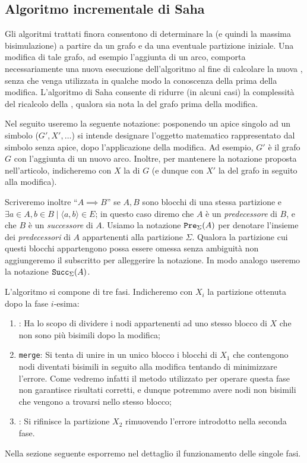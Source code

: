 \subsection{Algoritmo incrementale di Saha}
\label{sec:saha}
Gli algoritmi trattati finora consentono di determinare la \rscp (e quindi la massima bisimulazione) a partire da un grafo e da una eventuale partizione iniziale. Una modifica di tale grafo, ad esempio l'aggiunta di un arco, comporta necessariamente una nuova esecuzione dell'algoritmo al fine di calcolare la nuova \rscp, senza che venga utilizzata in qualche modo la conoscenza della \rscp prima della modifica. L'algoritmo di Saha \cite{saha} consente di ridurre (in alcuni casi) la complessità del ricalcolo della \rscp, qualora sia nota la \rscp del grafo prima della modifica.

Nel seguito useremo la seguente notazione: posponendo un apice singolo ad un simbolo ($G', X', \dots$) si intende designare l'oggetto matematico rappresentato dal simbolo senza apice, dopo l'applicazione della modifica. Ad esempio, $G'$ è il grafo $G$ con l'aggiunta di un nuovo arco. Inoltre, per mantenere la notazione proposta nell'articolo, indicheremo con $X$ la \rscp di $G$ (e dunque con $X'$ la \rscp del grafo in seguito alla modifica).

Scriveremo inoltre ``$A \implies B$'' se $A,B$ sono blocchi di una stessa partizione e $\exists a \in A, b \in B \mid \langle a, b\rangle \in E$; in questo caso diremo che $A$ è un \emph{predecessore} di $B$, e che $B$ è un \emph{successore} di $A$. Usiamo la notazione $\texttt{\textup{Pre}}_{\Sigma}(A)$ per denotare l'insieme dei \emph{predecessori} di $A$ appartenenti alla partizione $\Sigma$. Qualora la partizione cui questi blocchi appartengono possa essere omessa senza ambiguità non aggiungeremo il subscritto per alleggerire la notazione. In modo analogo useremo la notazione $\texttt{\textup{Succ}}_{\Sigma}(A)$.

L'algoritmo si compone di tre fasi. Indicheremo con $X_i$ la partizione ottenuta dopo la fase $i$-esima:
\begin{enumerate}
    \item \splitfunc: Ha lo scopo di dividere i nodi appartenenti ad uno stesso blocco di $X$ che non sono più bisimili dopo la modifica;
    \item \texttt{merge}: Si tenta di unire in un unico blocco i blocchi di $X_1$ che contengono nodi diventati bisimili in seguito alla modifica tentando di minimizzare l'errore. Come vedremo infatti il metodo utilizzato per operare questa fase non garantisce risultati corretti, e dunque potremmo avere nodi non bisimili che vengono a trovarsi nello stesso blocco;
    \item \splitfunc: Si rifinisce la partizione $X_2$ rimuovendo l'errore introdotto nella seconda fase.
\end{enumerate}
Nella sezione seguente esporremo nel dettaglio il funzionamento delle singole fasi.

